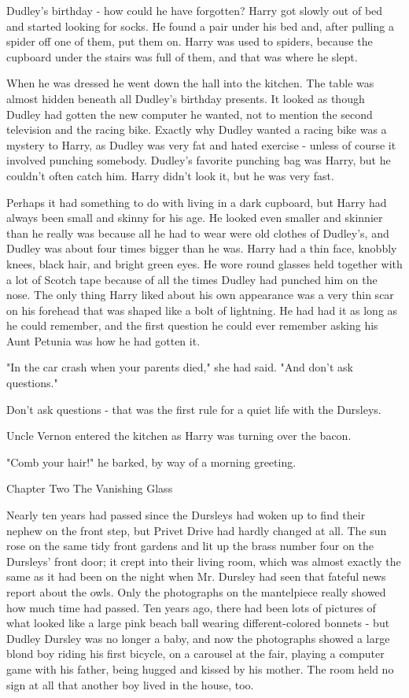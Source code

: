 Dudley's birthday - how could he have forgotten? Harry got slowly out of bed and started looking for socks. He found a pair under his bed and, after pulling a spider off one of them, put them on. Harry was used to spiders, because the cupboard under the stairs was full of them, and that was where he slept. 

When he was dressed he went down the hall into the kitchen. The table was almost hidden beneath all Dudley's birthday presents. It looked as though Dudley had gotten the new computer he wanted, not to mention the second television and the racing bike. Exactly why Dudley wanted a racing bike was a mystery to Harry, as Dudley was very fat and hated exercise - unless of course it involved punching somebody. Dudley's favorite punching bag was Harry, but he couldn't often catch him. Harry didn't look it, but he was very fast. 

Perhaps it had something to do with living in a dark cupboard, but Harry had always been small and skinny for his age. He looked even smaller and skinnier than he really was because all he had to wear were old clothes of Dudley's, and Dudley was about four times bigger than he was. Harry had a thin face, knobbly knees, black hair, and bright green eyes. He wore round glasses held together with a lot of Scotch tape because of all the times Dudley had punched him on the nose. The only thing Harry liked about his own appearance was a very thin scar on his forehead that was shaped like a bolt of lightning. He had had it as long as he could remember, and the first question he could ever remember asking his Aunt Petunia was how he had gotten it. 

"In the car crash when your parents died," she had said. "And don't ask questions." 

Don't ask questions - that was the first rule for a quiet life with the Dursleys. 

Uncle Vernon entered the kitchen as Harry was turning over the bacon. 

"Comb your hair!" he barked, by way of a morning greeting.

Chapter Two
The Vanishing Glass

Nearly ten years had passed since the Dursleys had woken up to find their nephew on the front step, but Privet Drive had hardly changed at all. The sun rose on the same tidy front gardens and lit up the brass number four on the Dursleys' front door; it crept into their living room, which was almost exactly the same as it had been on the night when Mr. Dursley had seen that fateful news report about the owls. Only the photographs on the mantelpiece really showed how much time had passed. Ten years ago, there had been lots of pictures of what looked like a large pink beach ball wearing different-colored bonnets - but Dudley Dursley was no longer a baby, and now the photographs showed a large blond boy riding his first bicycle, on a carousel at the fair, playing a computer game with his father, being hugged and kissed by his mother. The room held no sign at all that another boy lived in the house, too. 

